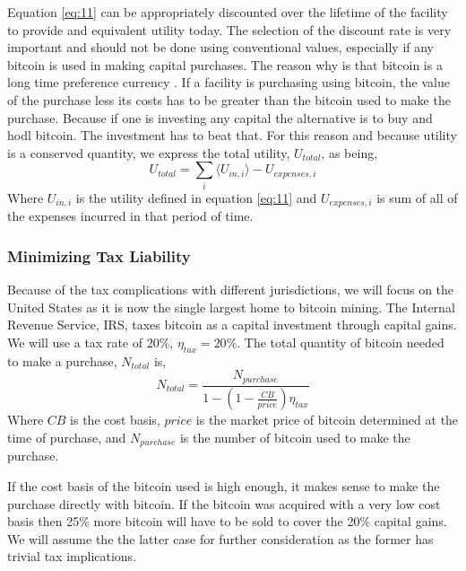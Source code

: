 \documentclass[runningheads]{llncs}
\begin{document}
Equation \ref{eq:11} can be appropriately discounted over the lifetime of the facility to provide and equivalent utility today.
The selection of the discount rate is very important and should not be done using conventional values, especially if any bitcoin is used in making capital purchases.
The reason why is that bitcoin is a long time preference currency \cite{ammous2018bitcoin}.
If a facility is purchasing using bitcoin, the value of the purchase less its costs has to be greater than the bitcoin used to make the purchase.
Because if one is investing any capital the alternative is to buy and hodl bitcoin.
The investment has to beat that.
For this reason and because utility is a conserved quantity, we express the total utility, $U_{total}$, as being,
\begin{equation}
    U_{total} = \sum_i \langle U_{in,i} \rangle - U_{expenses,i}\label{eq:12}
\end{equation}
Where $U_{in,i}$ is the utility defined in equation \ref{eq:11} and $U_{expenses,i}$ is sum of all of the expenses incurred in that period of time.

\subsubsection{Minimizing Tax Liability}
Because of the tax complications with different jurisdictions, we will focus on the United States as it is now the single largest home to bitcoin mining.
The Internal Revenue Service, IRS, taxes bitcoin as a capital investment through capital gains.
We will use a tax rate of 20\%, $\eta_{tax} = 20\%$.
The total quantity of bitcoin needed to make a purchase, $N_{total}$ is,
\begin{equation}
    N_{total} = \frac{N_{purchase}}{1-(1-\frac{CB}{price})\eta_{tax}}
\end{equation}
Where $CB$ is the cost basis, $price$ is the market price of bitcoin determined at the time of purchase, and $N_{purchase}$ is the number of bitcoin used to make the purchase.

If the cost basis of the bitcoin used is high enough, it makes sense to make the purchase directly with bitcoin.
If the bitcoin was acquired with a very low cost basis then 25\% more bitcoin will have to be sold to cover the 20\% capital gains.
We will assume the the latter case for further consideration as the former has trivial tax implications.
\end{document}
